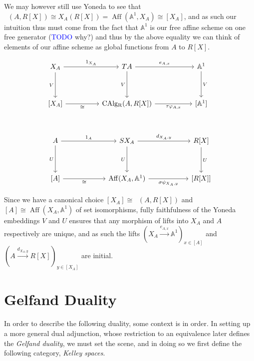 \documentclass[12pt,a4paper]{article}
\DeclareMathOperator{\CAlg}{CAlg_R}
\DeclareMathOperator{\Aff}{Aff}
\begin{document}
We may however still use Yoneda to see that $\CAlg(A, R[X]) \cong X_A(R[X]) = \Aff(\mathbb{A}^1, X_A) \cong [X_A]$, and as such our intuition thus must come from the fact that $\mathbb{A}^1$ is our free affine scheme on one free generator (\textcolor{blue}{TODO} why?) and  thus by the above equality we can think of elements of our affine scheme  as global functions from $A$ to $R[X]$.

\[\begin{tikzcd}
	{X_A} && TA && {\mathbb{A}^1} \\
	\\
	{[X_A]} && {\CAlg(A, R[X])} && {[\mathbb{A}^1]} \\
	\\
	A && {SX_A} && {R[X]} \\
	\\
	{[A]} && {\Aff(X_A, \mathbb{A}^1)} && {[R[X]]}
	\arrow["{1_{X_A}}", from=1-1, to=1-3]
	\arrow["V"', from=1-1, to=3-1]
	\arrow["{e_{A,x}}", from=1-3, to=1-5]
	\arrow["V"', from=1-3, to=3-3]
	\arrow["V", from=1-5, to=3-5]
	\arrow["\cong"', from=3-1, to=3-3]
	\arrow["{\tau \varphi_{A, x}}"', from=3-3, to=3-5]
	\arrow["{1_A}", from=5-1, to=5-3]
	\arrow["U"', from=5-1, to=7-1]
	\arrow["{d_{X_A,y}}", from=5-3, to=5-5]
	\arrow["U"', from=5-3, to=7-3]
	\arrow["U", from=5-5, to=7-5]
	\arrow["\cong"', from=7-1, to=7-3]
	\arrow["{\sigma\psi_{X_A,y}}"', from=7-3, to=7-5]
\end{tikzcd}\]

Since we have a canonical choice $[X_A] \cong \CAlg(A, R[X])$ and $[A] \cong \Aff(X_A,\mathbb{A}^1)$ of set isomorphisms, fully faithfulness of the Yoneda embeddings $V$ and $U$ ensures that any morphism of lifts into $X_A$ and $A$ respectively are unique, and as such the lifts $(X_A \stackrel{e_{A,x}}{\to}\mathbb{A}^1)_{x \in [A]}$ and $(A \stackrel{d_{X_A,y}}{\to} R[X])_{y \in [X_A]}$ are initial.
%

\section{Gelfand Duality}
In order to describe the following duality, some context is in order. In setting up a more general dual adjunction, whose restriction to an equivalence later defines the \emph{Gelfand duality}, we must set the scene, and in doing so we first define the following category, \emph{Kelley spaces}.
\end{document}
